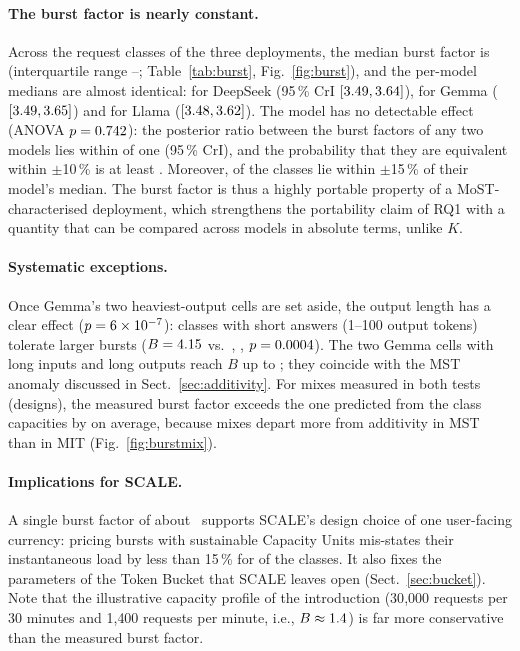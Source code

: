 \paragraph{The burst factor is nearly constant.} Across the \scaleBurstNCells request classes of the
three deployments, the median burst factor is \scaleBurstMedian (interquartile range
\scaleBurstQOne--\scaleBurstQThree; Table~\ref{tab:burst}, Fig.~\ref{fig:burst}), and the per-model
medians are almost identical: \scaleBurstDeepSeek for DeepSeek (95\,\% CrI
$[3.49, 3.64]$), \scaleBurstGemma for Gemma
($[3.49, 3.65]$) and \scaleBurstLlama for Llama
($[3.48, 3.62]$). The model has no detectable effect
(ANOVA $p=0.742$): the posterior ratio between the burst factors of any two models lies
within \scaleBurstPairCi of one (95\,\% CrI), and the probability that they are equivalent within
$\pm$10\,\% is at least \scaleBurstEquivMin. Moreover, \scaleBurstOnBand of the classes lie within
$\pm$15\,\% of their model's median. The burst factor is thus a highly portable property of a MoST-characterised deployment,
which strengthens the portability claim of RQ1 with a quantity that can be compared across models in
absolute terms, unlike $K$.

\paragraph{Systematic exceptions.} Once Gemma's two heaviest-output cells are set aside, the output
length has a clear effect ($p=6\times 10^{-7}$): classes with short answers (1--100 output
tokens) tolerate larger bursts ($B=4.15$ vs.\ \scaleBurstRest, \scaleBurstShortRatio,
$p=0.0004$). The two Gemma cells with long inputs and long outputs reach $B$ up to
\scaleBurstMaxGemma; they coincide with the MST anomaly discussed in Sect.~\ref{sec:additivity}.
For mixes measured in both tests (\scaleBurstMixN designs), the measured burst factor exceeds the one
predicted from the class capacities by \scaleBurstMixErr on average, because mixes depart more from
additivity in MST than in MIT (Fig.~\ref{fig:burstmix}).

\paragraph{Implications for SCALE.} A single burst factor of about \scaleBurstMedian\ supports SCALE's
design choice of one user-facing currency: pricing bursts with sustainable Capacity Units mis-states
their instantaneous load by less than 15\,\% for \scaleBurstOnBand of the classes. It also fixes the parameters of the Token Bucket that SCALE leaves open
(Sect.~\ref{sec:bucket}). Note that the illustrative capacity profile of the introduction
(30{,}000 requests per 30 minutes and 1{,}400 requests per minute, i.e., $B\approx1.4$)
is far more conservative than the measured burst factor.

